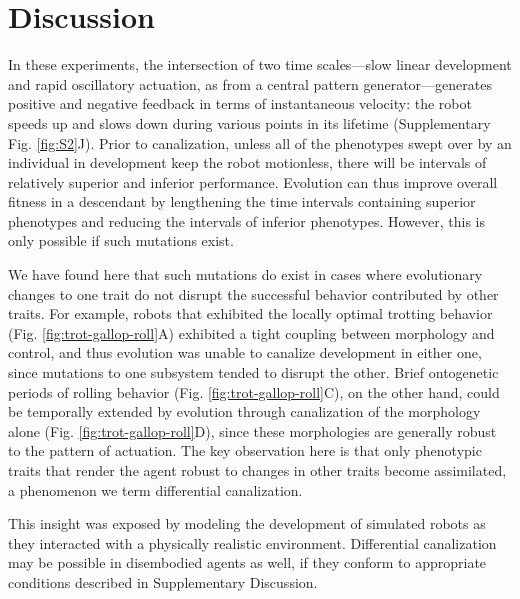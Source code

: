 \section{Discussion}
\label{sec4:discussion}

 
In these experiments, the intersection of two time scales---slow linear development and rapid oscillatory actuation, as from a central pattern generator---generates positive and negative feedback in terms of instantaneous velocity: the robot speeds up and slows down during various points in its lifetime (Supplementary Fig. \ref{fig:S2}J).%
Prior to canalization, unless all of the phenotypes swept over by an individual in development keep the robot motionless, there will be intervals of relatively superior and inferior performance.
Evolution can thus improve overall fitness in a descendant by lengthening the time intervals containing superior phenotypes and reducing the intervals of inferior phenotypes. However, this is only possible if such mutations exist.

We have found here that such mutations do exist in cases where evolutionary changes
to one trait do not disrupt the successful behavior contributed
by other traits.
For example,
robots that exhibited the locally optimal trotting behavior 
(Fig. \ref{fig:trot-gallop-roll}A)
exhibited a tight coupling between morphology and control, and thus evolution was 
unable to canalize development in either one, since mutations to one subsystem 
tended to disrupt the other.
Brief ontogenetic periods of rolling behavior 
(Fig. \ref{fig:trot-gallop-roll}C), 
on the other hand, could be temporally extended by evolution through canalization of the morphology alone
(Fig. \ref{fig:trot-gallop-roll}D), 
since these morphologies are generally robust to the pattern of actuation.
The key observation here is that only phenotypic traits that render the agent robust to changes in other traits become assimilated, a phenomenon we term differential canalization. 

This insight was exposed by modeling the development of simulated robots as they interacted with a physically realistic environment.
Differential canalization may be possible in disembodied agents as well, 
if they conform to appropriate conditions described in Supplementary Discussion.

